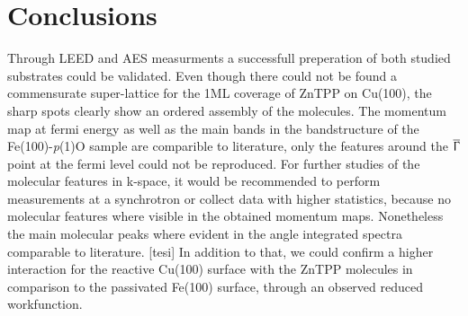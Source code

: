 \chapter{Conclusions}

Through LEED and AES measurments a successfull preperation of both studied substrates could be validated.
Even though there could not be found a commensurate super-lattice for the 1ML coverage of ZnTPP on Cu(100), the sharp spots clearly show an ordered assembly of the molecules.
The momentum map at fermi energy as well as the main bands in the bandstructure of the Fe(100)-\textit{p}(1)O sample are comparible to literature, only the features around the $\overline{\Upgamma}$ point at the fermi level could not be reproduced.
For further studies of the molecular features in k-space, it would be recommended to perform measurements at a synchrotron or collect data with higher statistics, because no molecular features where visible in the obtained momentum maps.
Nonetheless the main molecular peaks where evident in the angle integrated spectra comparable to literature. [tesi]
In addition to that, we could confirm a higher interaction for the reactive Cu(100) surface with the ZnTPP molecules in comparison to the passivated Fe(100) surface, through an observed reduced workfunction.

